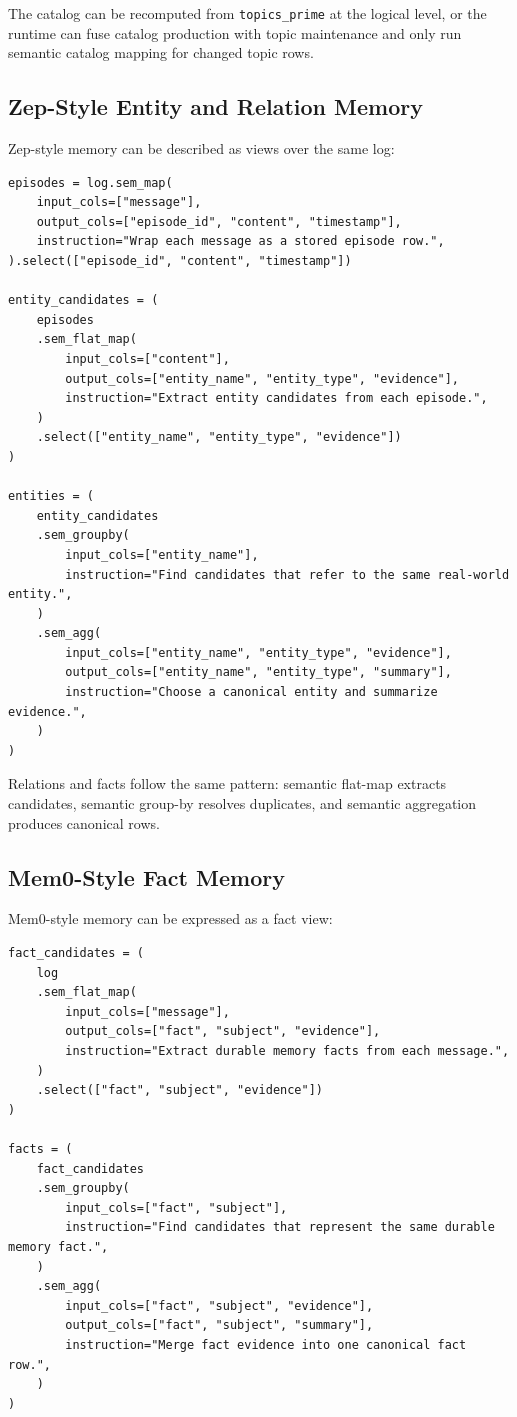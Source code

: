 \documentclass[11pt]{article}
\begin{document}
The catalog can be recomputed from \texttt{topics\_prime} at the logical level,
or the runtime can fuse catalog production with topic maintenance and only run
semantic catalog mapping for changed topic rows.

\subsection{Zep-Style Entity and Relation Memory}

Zep-style memory can be described as views over the same log:

\begin{verbatim}
episodes = log.sem_map(
    input_cols=["message"],
    output_cols=["episode_id", "content", "timestamp"],
    instruction="Wrap each message as a stored episode row.",
).select(["episode_id", "content", "timestamp"])

entity_candidates = (
    episodes
    .sem_flat_map(
        input_cols=["content"],
        output_cols=["entity_name", "entity_type", "evidence"],
        instruction="Extract entity candidates from each episode.",
    )
    .select(["entity_name", "entity_type", "evidence"])
)

entities = (
    entity_candidates
    .sem_groupby(
        input_cols=["entity_name"],
        instruction="Find candidates that refer to the same real-world entity.",
    )
    .sem_agg(
        input_cols=["entity_name", "entity_type", "evidence"],
        output_cols=["entity_name", "entity_type", "summary"],
        instruction="Choose a canonical entity and summarize evidence.",
    )
)
\end{verbatim}

Relations and facts follow the same pattern: semantic flat-map extracts
candidates, semantic group-by resolves duplicates, and semantic aggregation
produces canonical rows.

\subsection{Mem0-Style Fact Memory}

Mem0-style memory can be expressed as a fact view:

\begin{verbatim}
fact_candidates = (
    log
    .sem_flat_map(
        input_cols=["message"],
        output_cols=["fact", "subject", "evidence"],
        instruction="Extract durable memory facts from each message.",
    )
    .select(["fact", "subject", "evidence"])
)

facts = (
    fact_candidates
    .sem_groupby(
        input_cols=["fact", "subject"],
        instruction="Find candidates that represent the same durable memory fact.",
    )
    .sem_agg(
        input_cols=["fact", "subject", "evidence"],
        output_cols=["fact", "subject", "summary"],
        instruction="Merge fact evidence into one canonical fact row.",
    )
)
\end{verbatim}
\end{document}
